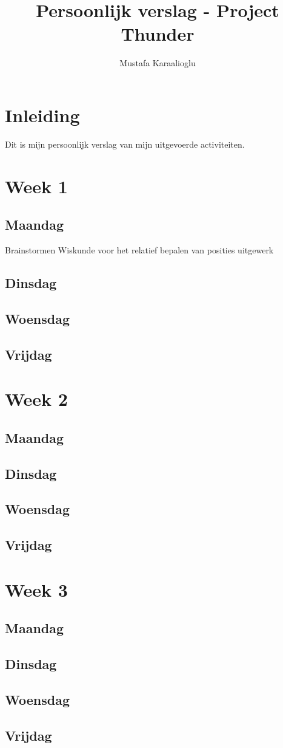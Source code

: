 \documentclass[12pt]{article}
\author{Mustafa Karaalioglu}
\begin{document}
\title{Persoonlijk verslag - Project Thunder}
\maketitle

\section*{Inleiding}
Dit is mijn persoonlijk verslag van mijn uitgevoerde activiteiten.

\section*{Week 1}
\subsection*{Maandag}
Brainstormen
Wiskunde voor het relatief bepalen van posities uitgewerk

\subsection*{Dinsdag}
\subsection*{Woensdag}
\subsection*{Vrijdag}

\section*{Week 2}
\subsection*{Maandag}
\subsection*{Dinsdag}
\subsection*{Woensdag}
\subsection*{Vrijdag}

\section*{Week 3}
\subsection*{Maandag}
\subsection*{Dinsdag}
\subsection*{Woensdag}
\subsection*{Vrijdag}
\end{document}
